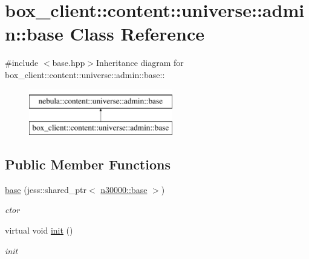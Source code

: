 \hypertarget{classbox__client_1_1content_1_1universe_1_1admin_1_1base}{
\section{box\_\-client::content::universe::admin::base Class Reference}
\label{classbox__client_1_1content_1_1universe_1_1admin_1_1base}
}


{\ttfamily \#include $<$base.hpp$>$}Inheritance diagram for box\_\-client::content::universe::admin::base::\begin{figure}[H]
\begin{center}
\leavevmode
\includegraphics[height=2cm]{classbox__client_1_1content_1_1universe_1_1admin_1_1base}
\end{center}
\end{figure}
\subsection*{Public Member Functions}
\begin{DoxyCompactItemize}
\item 
\hyperlink{classbox__client_1_1content_1_1universe_1_1admin_1_1base_a85bffca5e38b5fa3e24d8608b2a00166}{base} (jess::shared\_\-ptr$<$ \hyperlink{classnebula_1_1content_1_1base}{n30000::base} $>$)
\begin{DoxyCompactList}\small\item\em ctor \item\end{DoxyCompactList}\item 
virtual void \hyperlink{classbox__client_1_1content_1_1universe_1_1admin_1_1base_a9a49454fde89dacb9318efaa72532505}{init} ()
\begin{DoxyCompactList}\small\item\em init \item\end{DoxyCompactList}\end{DoxyCompactItemize}


